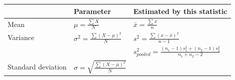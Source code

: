 \documentclass[
]{krantz}
\begin{document}
\begin{longtable}[]{@{}lll@{}}
\toprule
\begin{minipage}[b]{0.30\columnwidth}\raggedright
\strut
\end{minipage} & \begin{minipage}[b]{0.30\columnwidth}\raggedright
Parameter\strut
\end{minipage} & \begin{minipage}[b]{0.30\columnwidth}\raggedright
Estimated by this statistic\strut
\end{minipage}\tabularnewline
\midrule
\endhead
\begin{minipage}[t]{0.30\columnwidth}\raggedright
Mean\strut
\end{minipage} & \begin{minipage}[t]{0.30\columnwidth}\raggedright
\(\mu = \frac{\sum{X}}{N}\)\strut
\end{minipage} & \begin{minipage}[t]{0.30\columnwidth}\raggedright
\(\bar{x} = \frac{\sum{x}}{n}\)\strut
\end{minipage}\tabularnewline
\begin{minipage}[t]{0.30\columnwidth}\raggedright
Variance\strut
\end{minipage} & \begin{minipage}[t]{0.30\columnwidth}\raggedright
\(\sigma^2 = \frac{\sum{(X - \mu)^2}}{N}\)\strut
\end{minipage} & \begin{minipage}[t]{0.30\columnwidth}\raggedright
\(s^2 = \frac{\sum{(x - \bar{x})^2}}{n-1}\)\strut
\end{minipage}\tabularnewline
\begin{minipage}[t]{0.30\columnwidth}\raggedright
\strut
\end{minipage} & \begin{minipage}[t]{0.30\columnwidth}\raggedright
\strut
\end{minipage} & \begin{minipage}[t]{0.30\columnwidth}\raggedright
\(s_{pooled}^2 = \frac{(n_1 -1)s_1^2 + (n_2 -1)s_2^2}{n_1 + n_2-2}\)\strut
\end{minipage}\tabularnewline
\begin{minipage}[t]{0.30\columnwidth}\raggedright
Standard deviation\strut
\end{minipage} & \begin{minipage}[t]{0.30\columnwidth}\raggedright
\(\sigma = \sqrt{\frac{\sum{(X - \mu)^2}}{N}}\)\strut
\end{minipage} & \begin{minipage}[t]{0.30\columnwidth}\raggedright

\end{minipage}
\end{longtable}
\end{document}
